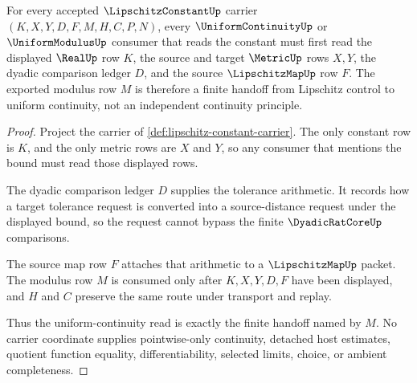 \begin{theorem}\label{thm:lipschitz-constant-modulus-handoff}
For every accepted $\LipschitzConstantUp$ carrier $(K,X,Y,D,F,M,H,C,P,N)$, every $\UniformContinuityUp$ or $\UniformModulusUp$ consumer that reads the constant must first read the displayed $\RealUp$ row $K$, the source and target $\MetricUp$ rows $X,Y$, the dyadic comparison ledger $D$, and the source $\LipschitzMapUp$ row $F$. The exported modulus row $M$ is therefore a finite handoff from Lipschitz control to uniform continuity, not an independent continuity principle.
\end{theorem}
\begin{proof}
Project the carrier of \autoref{def:lipschitz-constant-carrier}. The only constant row is $K$, and the only metric rows are $X$ and $Y$, so any consumer that mentions the bound must read those displayed rows.

The dyadic comparison ledger $D$ supplies the tolerance arithmetic. It records how a target tolerance request is converted into a source-distance request under the displayed bound, so the request cannot bypass the finite $\DyadicRatCoreUp$ comparisons.

The source map row $F$ attaches that arithmetic to a $\LipschitzMapUp$ packet. The modulus row $M$ is consumed only after $K,X,Y,D,F$ have been displayed, and $H$ and $C$ preserve the same route under transport and replay.

Thus the uniform-continuity read is exactly the finite handoff named by $M$. No carrier coordinate supplies pointwise-only continuity, detached host estimates, quotient function equality, differentiability, selected limits, choice, or ambient completeness.
\end{proof}

